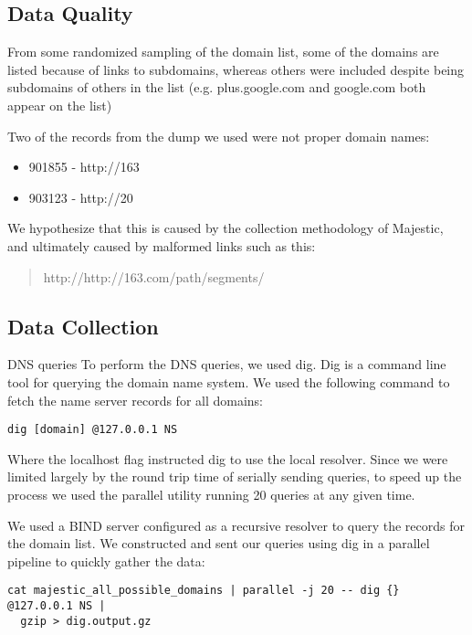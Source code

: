 \documentclass{idc_msc}
\begin{document}

\subsection{Data Quality}

From some randomized sampling of the domain list, some of the domains are listed because of links to subdomains, whereas others were included despite being subdomains of others in the list (e.g. plus.google.com and google.com both appear on the list)

Two of the records from the dump we used were not proper domain names:

\begin{itemize}
  \item 901855 - http://163
  \item 903123 - http://20
\end{itemize}

We hypothesize that this is caused by the collection methodology of Majestic, and ultimately caused by malformed links such as this:
\begin{quote}
http://http://163.com/path/segments/
\end{quote}

\subsection{Data Collection}

DNS queries
To perform the DNS queries, we used dig. Dig is a command line tool for querying the domain name system. We used the following command to fetch the name server records for all domains:
\begin{verbatim}
dig [domain] @127.0.0.1 NS
\end{verbatim}
Where the localhost flag instructed dig to use the local resolver.
Since we were limited largely by the round trip time of serially sending queries, to speed up the process we used the parallel utility running 20 queries at any given time.

We used a BIND server configured as a recursive resolver to query the records for the domain list.
We constructed and sent our queries using dig in a parallel \cite{Tange2011a} pipeline to quickly gather the data:

\begin{verbatim}
cat majestic_all_possible_domains | parallel -j 20 -- dig {} @127.0.0.1 NS | 
  gzip > dig.output.gz
\end{verbatim}
\end{document}
